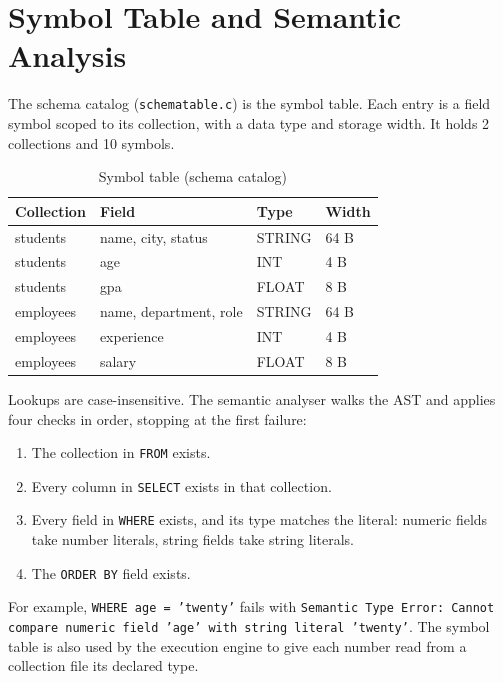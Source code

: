 \documentclass[12pt,a4paper]{report}
\newcommand{\codeus}{\textunderscore\allowbreak}
\DeclareRobustCommand{\code}[1]{\texttt{\let\_\codeus #1}}
\begin{document}
\section{Symbol Table and Semantic Analysis}
The schema catalog (\code{schema\_table.c}) is the symbol table. Each entry is a field symbol scoped to its collection, with a data type and storage width. It holds 2 collections and 10 symbols.
\begin{table}[H]
\centering\small
\begin{tabular}{|l|l|l|l|}
\hline
\textbf{Collection} & \textbf{Field} & \textbf{Type} & \textbf{Width} \\ \hline
students & name, city, status & STRING & 64 B \\ \hline
students & age & INT & 4 B \\ \hline
students & gpa & FLOAT & 8 B \\ \hline
employees & name, department, role & STRING & 64 B \\ \hline
employees & experience & INT & 4 B \\ \hline
employees & salary & FLOAT & 8 B \\ \hline
\end{tabular}
\caption{Symbol table (schema catalog)}
\end{table}

Lookups are case-insensitive. The semantic analyser walks the AST and applies four checks in order, stopping at the first failure:
\begin{enumerate}
  \item The collection in \code{FROM} exists.
  \item Every column in \code{SELECT} exists in that collection.
  \item Every field in \code{WHERE} exists, and its type matches the literal: numeric fields take number literals, string fields take string literals.
  \item The \code{ORDER BY} field exists.
\end{enumerate}
For example, \code{WHERE age = 'twenty'} fails with \code{Semantic Type Error: Cannot compare numeric field 'age' with string literal 'twenty'}. The symbol table is also used by the execution engine to give each number read from a collection file its declared type.
\end{document}
